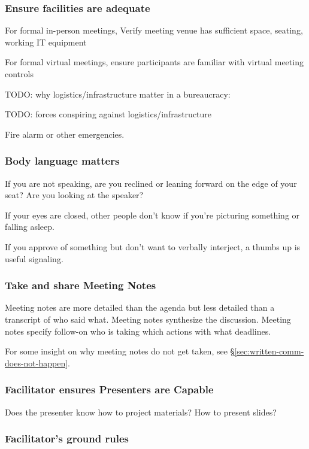 \subsubsection{Ensure facilities are adequate}
For formal in-person meetings, Verify meeting venue has sufficient space, seating, working IT equipment

For formal virtual meetings, ensure participants are familiar with virtual meeting controls

TODO: why logistics/infrastructure matter in a bureaucracy:

TODO: forces conspiring against logistics/infrastructure

Fire alarm or other emergencies. 

\subsubsection{Body language matters}

If you are not speaking, are you reclined or leaning forward on the edge of your seat? Are you looking at the speaker?

If your eyes are closed, other people don't know if you're picturing something or falling asleep. 

If you approve of something but don't want to verbally interject, a thumbs up is useful signaling. 

\subsubsection{Take and share Meeting Notes}

Meeting notes are more detailed than the agenda but less detailed than a transcript of who said what. Meeting notes synthesize the discussion. Meeting notes specify follow-on who is taking which actions with what deadlines. 

For some insight on why meeting notes do not get taken, see \S\ref{sec:written-comm-does-not-happen}. 

\subsubsection{Facilitator ensures Presenters are Capable}

Does the presenter know how to project materials? How to present slides?

\subsubsection{Facilitator's ground rules}

